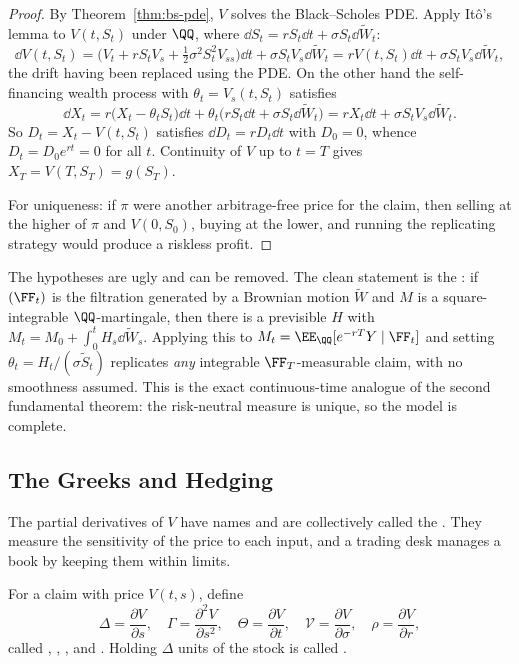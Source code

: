 \begin{proof}
	By Theorem~\ref{thm:bs-pde}, $V$ solves the Black--Scholes PDE. Apply It\^o's lemma to $V(t,S_t)$ under $\QQ$, where $\dd S_t = rS_t\dd t + \sigma S_t\dd\tilde W_t$:
	$$
	\dd V(t,S_t) = \Big(V_t + rS_tV_s + \tfrac12\sigma^2S_t^2V_{ss}\Big)\dd t + \sigma S_tV_s\dd\tilde W_t = rV(t,S_t)\dd t + \sigma S_tV_s\dd\tilde W_t,
	$$
	the drift having been replaced using the PDE. On the other hand the self-financing wealth process with $\theta_t = V_s(t,S_t)$ satisfies
	$$
	\dd X_t = r\big(X_t - \theta_tS_t\big)\dd t + \theta_t\big(rS_t\dd t + \sigma S_t\dd\tilde W_t\big) = rX_t\dd t + \sigma S_tV_s\dd\tilde W_t.
	$$
	So $D_t = X_t - V(t,S_t)$ satisfies $\dd D_t = rD_t\dd t$ with $D_0 = 0$, whence $D_t = D_0e^{rt} = 0$ for all $t$. Continuity of $V$ up to $t=T$ gives $X_T = V(T,S_T) = g(S_T)$.

	For uniqueness: if $\pi$ were another arbitrage-free price for the claim, then selling at the higher of $\pi$ and $V(0,S_0)$, buying at the lower, and running the replicating strategy would produce a riskless profit.
\end{proof}

\begin{remark}
	The hypotheses are ugly and can be removed. The clean statement is the : if $(\FF_t)$ is the filtration generated by a Brownian motion $\tilde W$ and $M$ is a square-integrable $\QQ$-martingale, then there is a previsible $H$ with $M_t = M_0 + \int_0^tH_s\dd\tilde W_s$. Applying this to $M_t = \EE_\QQ[e^{-rT}Y\mid\FF_t]$ and setting $\theta_t = H_t/(\sigma \tilde S_t)$ replicates \emph{any} integrable $\FF_T$-measurable claim, with no smoothness assumed. This is the exact continuous-time analogue of the second fundamental theorem: the risk-neutral measure is unique, so the model is complete.
\end{remark}

\subsection{The Greeks and Hedging}

The partial derivatives of $V$ have names and are collectively called the . They measure the sensitivity of the price to each input, and a trading desk manages a book by keeping them within limits.

\begin{definition}
	For a claim with price $V(t,s)$, define
	$$
	\Delta = \frac{\partial V}{\partial s}, \quad \Gamma = \frac{\partial^2V}{\partial s^2}, \quad \Theta = \frac{\partial V}{\partial t}, \quad \mathcal{V} = \frac{\partial V}{\partial \sigma}, \quad \rho = \frac{\partial V}{\partial r},
	$$
	called , , ,  and . Holding $\Delta$ units of the stock is called .
\end{definition}

